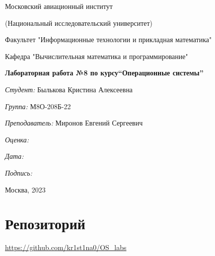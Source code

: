 \documentclass[a4paper, 12pt]{article}
\begin{document}
\thispagestyle{empty}	
\begin{center}
	Московский авиационный институт
	
	(Национальный исследовательский университет)
	
	Факультет "Информационные технологии и прикладная математика"
	
	Кафедра "Вычислительная математика и программирование"
	
\end{center}
\vspace{40ex}
\begin{center}
	\textbf{\large{Лабораторная работа №8 по курсу\linebreak \textquotedblleft Операционные системы\textquotedblright}}
\end{center}
\vspace{35ex}
\begin{flushright}
	\textit{Студент: } Былькова Кристина Алексеевна
	
	\vspace{2ex}
	\textit{Группа: } М8О-208Б-22
	
	\vspace{2ex}
	\textit{Преподаватель: } Миронов Евгений Сергеевич
	
	\vspace{2ex}
	\textit{Оценка: } \underline{\quad\quad\quad\quad\quad\quad}
	
	 \vspace{2ex}
	\textit{Дата: } \underline{\quad\quad\quad\quad\quad\quad}
	
	\vspace{2ex}
	\textit{Подпись: } \underline{\quad\quad\quad\quad\quad\quad}
	
\end{flushright}

\vspace{5ex}

\begin{vfill}
	\begin{center}
		Москва, 2023
	\end{center}	
\end{vfill}
\newpage


\begingroup
\color{black}
\tableofcontents\newpage
\endgroup

\section{Репозиторий}
\href{https://github.com/kr1st1na0/OS\_labs}{https://github.com/kr1st1na0/OS\_labs}
\end{document}
